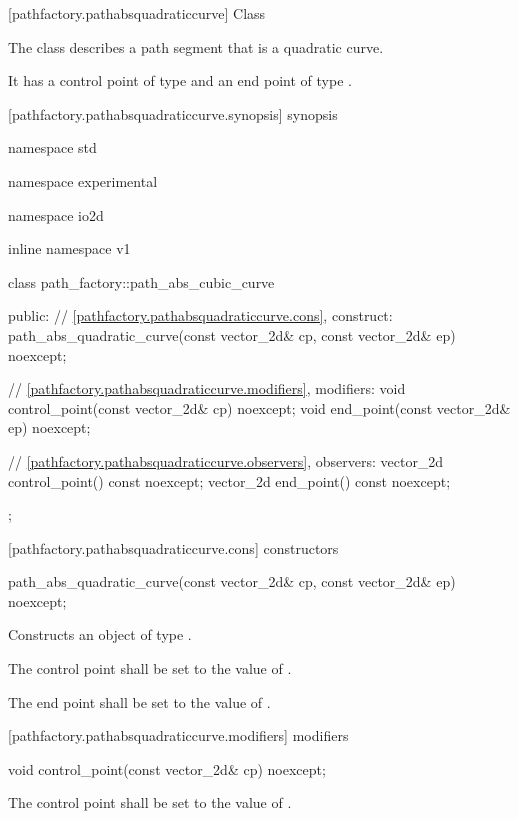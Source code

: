  [pathfactory.pathabsquadraticcurve] {Class }

\pnum
{}
The class  describes a path segment that is a quadratic \bezierlocal curve.

\pnum
It has a control point of type  and an end point of type .

 [pathfactory.pathabsquadraticcurve.synopsis] { synopsis}

\begin{codeblock}
namespace std { namespace experimental { namespace io2d { inline namespace v1 {
  class path_factory::path_abs_cubic_curve {
  public:
    // \ref{pathfactory.pathabsquadraticcurve.cons}, construct:
    path_abs_quadratic_curve(const vector_2d& cp, const vector_2d& ep) noexcept;

    // \ref{pathfactory.pathabsquadraticcurve.modifiers}, modifiers:
    void control_point(const vector_2d& cp) noexcept;
    void end_point(const vector_2d& ep) noexcept;


    // \ref{pathfactory.pathabsquadraticcurve.observers}, observers:
    vector_2d control_point() const noexcept;
    vector_2d end_point() const noexcept;
  };
} } } }
\end{codeblock}

 [pathfactory.pathabsquadraticcurve.cons] { constructors}

\begin{itemdecl}
    path_abs_quadratic_curve(const vector_2d& cp, const vector_2d& ep) noexcept;
\end{itemdecl}
\begin{itemdescr}
	\pnum
	\effects
	Constructs an object of type .
	
	\pnum
	The control point shall be set to the value of .
	
	\pnum
	The end point shall be set to the value of .
\end{itemdescr}

 [pathfactory.pathabsquadraticcurve.modifiers]{ modifiers}

\begin{itemdecl}
    void control_point(const vector_2d& cp) noexcept;
\end{itemdecl}
\begin{itemdescr}
	\pnum
	\effects
	The control point shall be set to the value of .
\end{itemdescr}

